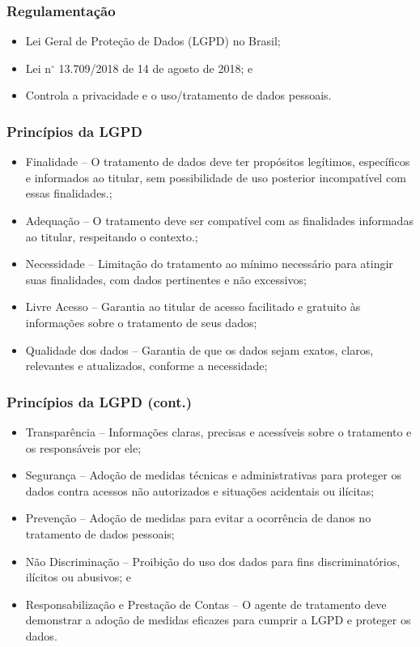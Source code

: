\documentclass[aspectratio=169]{beamer} %
\begin{document}
\begin{frame}
	\frametitle{Regulamentação}
	
	\begin{itemize}
		\item Lei Geral de Proteção de Dados (LGPD) no Brasil;
		\item Lei n$^{\circ}$ 13.709/2018 de 14 de agosto de 2018; e
		\item Controla a privacidade e o uso/tratamento de dados pessoais.
	\end{itemize}
\end{frame}

\begin{frame}
	\frametitle{Princípios da LGPD}
	
	\begin{itemize}
		\item Finalidade -- O tratamento de dados deve ter propósitos legítimos, específicos e informados ao titular, sem possibilidade de uso posterior incompatível com essas finalidades.;
		\item Adequação -- O tratamento deve ser compatível com as finalidades informadas ao titular, respeitando o contexto.;
		\item Necessidade -- Limitação do tratamento ao mínimo necessário para atingir suas finalidades, com dados pertinentes e não excessivos;
		\item Livre Acesso -- Garantia ao titular de acesso facilitado e gratuito às informações sobre o tratamento de seus dados;
		\item Qualidade dos dados -- Garantia de que os dados sejam exatos, claros, relevantes e atualizados, conforme a necessidade;
	\end{itemize}
\end{frame}

\begin{frame}
	\frametitle{Princípios da LGPD (cont.)}
	
	\begin{itemize}
		\item Transparência -- Informações claras, precisas e acessíveis sobre o tratamento e os responsáveis por ele;
		\item Segurança -- Adoção de medidas técnicas e administrativas para proteger os dados contra acessos não autorizados e situações acidentais ou ilícitas;
		\item Prevenção -- Adoção de medidas para evitar a ocorrência de danos no tratamento de dados pessoais;
		\item Não Discriminação -- Proibição do uso dos dados para fins discriminatórios, ilícitos ou abusivos; e
		\item Responsabilização e Prestação de Contas -- O agente de tratamento deve demonstrar a adoção de medidas eficazes para cumprir a LGPD e proteger os dados.
	\end{itemize}
\end{frame}
\end{document}
